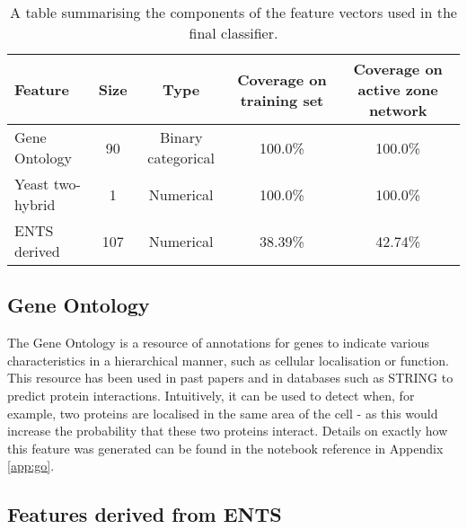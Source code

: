 \begin{table}
    \centering
    \begin{tabular}{l c c c c}
        Feature         &   Size &  Type                &  Coverage on training set &  Coverage on active zone network \\
        \hline
        Gene Ontology    &  90   &  Binary categorical  &  100.0\%                  & 100.0\%                          \\
        Yeast two-hybrid &  1    &  Numerical           &  100.0\%                  & 100.0\%                          \\
        ENTS derived     &  107  &  Numerical           &  38.39\%                  & 42.74\%                          \\
    \end{tabular}
    \caption{A table summarising the components of the feature vectors used in the final classifier.}
    \label{tab:features}
\end{table}

\subsection{Gene Ontology}
\label{go}

The Gene Ontology\autocite{ashburner_gene_2000} is a resource of annotations for genes to indicate various characteristics in a hierarchical manner, such as cellular localisation or function.
This resource has been used in past papers\autocite{qi_evaluation_2006} and in databases such as STRING\autocite{von-mering_string:_2005} to predict protein interactions.
Intuitively, it can be used to detect when, for example, two proteins are localised in the same area of the cell - as this would increase the probability that these two proteins interact.
Details on exactly how this feature was generated can be found in the notebook reference in Appendix \ref{app:go}.

\subsection{Features derived from ENTS}
\label{ents}

